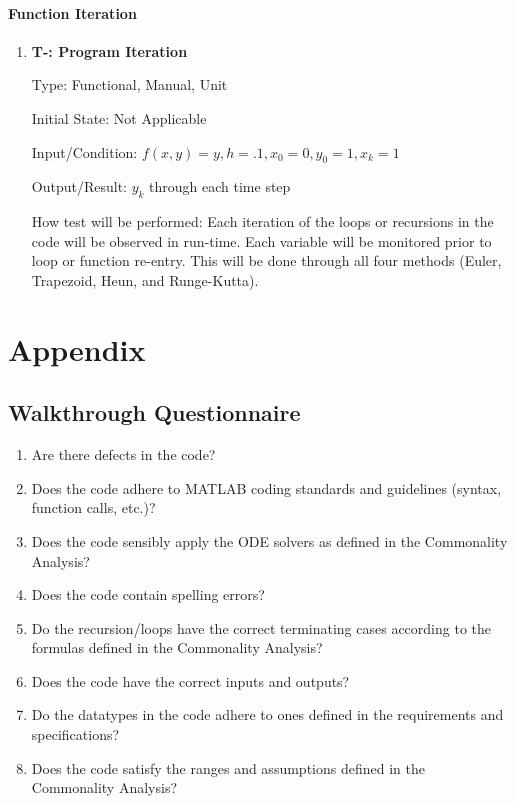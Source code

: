 \documentclass[12pt, titlepage]{article}
\newcounter{tnum} %
\begin{document}

\paragraph{Function Iteration}

\begin{enumerate}

\item{\textbf{T-\thetnum \label{t-difference}: Program Iteration}}

Type: Functional, Manual, Unit 
					
Initial State: Not Applicable
					
Input/Condition: $f(x, y) = y, h = .1, x_0 = 0, y_0 = 1, x_k = 1$
					
Output/Result: $y_k$ through each time step

How test will be performed: Each iteration of the loops or recursions in the code will be observed in run-time.
Each variable will be monitored prior to loop or function re-entry. This will be done through all four methods (Euler, 
Trapezoid, Heun, and Runge-Kutta).

\end{enumerate}





\newpage

\section{Appendix}

\subsection{Walkthrough Questionnaire} \label{checklist}
\begin{enumerate}
\item{Are there defects in the code?}
\item{Does the code adhere to MATLAB coding standards and guidelines (syntax, function calls, etc.)?}
\item{Does the code sensibly apply the ODE solvers as defined in the Commonality Analysis?}
\item{Does the code contain spelling errors?}
\item{Do the recursion/loops have the correct terminating cases according to the formulas defined in the Commonality Analysis?}
\item{Does the code have the correct inputs and outputs?}  
\item{Do the datatypes in the code adhere to ones defined in the requirements and specifications?}
\item{Does the code satisfy the ranges and assumptions defined in the Commonality Analysis?}
\end{enumerate}
\end{document}
